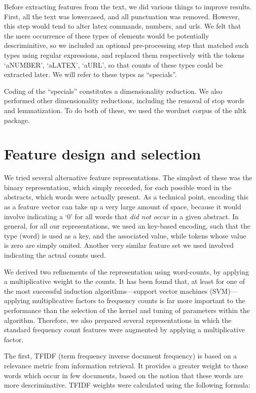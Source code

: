 \documentclass[conference,letterpaper]{IEEEtran}
\begin{document}
Before extracting features from the text, we did various things to improve
results.  First, all the text was lowercased, and all punctuation was 
removed.  However, this step would tend to alter latex commands, numbers,
and urls.  We felt that the mere occurrence of these types of elements would
be potentially descriminitive, so we included an optional pre-processing step
that matched such types using regular expressions, and replaced them 
respectively with the tokens `aNUMBER', `aLATEX', `aURL', so that counts of
these types could be extracted later.  We will refer to these types as 
``specials''.

Coding of the ``specials'' constitutes a dimensionality reduction.  We also
performed other dimensionality reductions, including the removal of 
stop words and lemmatization.  To do both of these, we used the
wordnet corpus of the nltk package.

 
\section{Feature design and selection}
We tried several alternative feature representations.  The simplest of these
was the binary representation, which simply recorded, for each possible 
word in the abstracts, which words were actually present.  As a technical
point, encoding this as a feature vector can take up a very large amount of
space, because it would involve indicating a `0' for all words that 
\textit{did not occur} in a given abstract.  In general, for all our 
representations, we used an key-based encoding, such that the type (word)
is used as a key, and the associated value, while tokens whose value is 
zero are simply omited.  Another very similar feature set we used involved 
indicating the actual counts used.

We derived two refinements of the representation using word-counts, by applying
a multiplicative weight to the counts.  It has been found that, at least for
one of the most successful induction algorithms---support vector machines 
(SVM)---applying multiplicative factors to frequency counts is far more 
important to the performance than the selection of the kernel and tuning of 
parameters within the algorithm.  Therefore, we also prepared several 
representations in which the standard frequency count features were augmented
by applying a multiplicative factor.

The first, TFIDF (term frequency inverse document frequency) is based 
on a relevance metric from information retrieval.  It provides a greater 
weight to those words which occur in 
few documents, based on the notion that these words are more descriminative.
TFIDF weights were calculated using the following formula:
\end{document}
